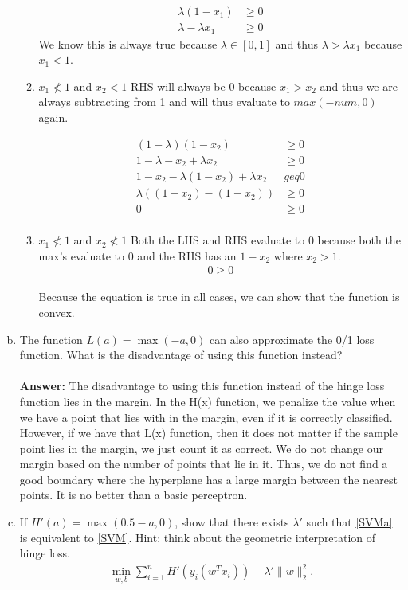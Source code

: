 \documentclass[11pt]{article}
\begin{document}
\begin{enumerate}[(a)]
\begin{enumerate}
	\begin{align*}
	\lambda(1- x_1) &\geq 0 \\
	\lambda - \lambda x_1 &\geq 0
	\end{align*}
	We know this is always true because $\lambda \in [0,1]$ and thus $\lambda > \lambda x_1$ because $x_1 < 1$.

	\item $x_1 \nless 1$ and $x_2 < 1$
	RHS will always be 0 because $x_1 > x_2$ and thus we are always subtracting from 1 and will thus evaluate to $max(-num, 0)$ again.

	\begin{align*}
	(1-\lambda) (1-x_2) &\geq 0 \\
	1 - \lambda - x_2 + \lambda x_2 &\geq 0 \\
	1 - x_2 - \lambda (1-x_2) + \lambda x_2 &geq 0 \\
	\lambda( (1-x_2) - (1-x_2)) &\geq 0 \\
	0 &\geq 0 \\
	\end{align*}
	\item $x_1 \nless 1$ and $x_2 \nless 1$
	Both the LHS and RHS evaluate to 0 because both the max's evaluate to 0 and the RHS has an $1 - x_2$ where $x_2 > 1$.
	\begin{align*}
	0 \geq 0
	\end{align*}

	Because the equation is true in all cases, we can show that the function is convex.
\end{enumerate}



\item The function $L(a) = \max(-a,0)$ can also approximate the 0/1 loss function. What is the disadvantage of using this function instead?
\\ \\
{\bf Answer: }
The disadvantage to using this function instead of the hinge loss function lies in the margin. In the H(x) function, we penalize the value when we have a point that lies with in the margin, even if it is correctly classified. However, if we have that L(x) function, then it does not matter if the sample point lies in the margin, we just count it as correct. We do not change our margin based on the number of points that lie in it. Thus, we do not find a good boundary where the hyperplane has a large margin between the nearest points. It is no better than a basic perceptron.


\item If $H'(a) = \max(0.5-a,0)$, show that there exists $\lambda'$ such that \eqref{SVMa} is equivalent to \eqref{SVM}.  Hint: think about the geometric interpretation of hinge loss.
\begin{align}\label{SVMa}
\min_{w,b}\sum_{i=1}^n H'(y_i(w^Tx_i)) + \lambda'\|w\|_2^2.
\end{align}


\end{enumerate}
\end{document}
